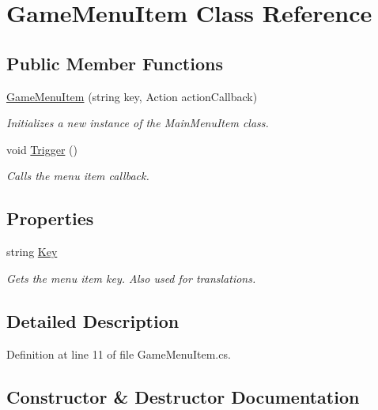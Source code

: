 \hypertarget{class_game_menu_item}{}\section{Game\+Menu\+Item Class Reference}
\label{class_game_menu_item}
\subsection*{Public Member Functions}
\begin{DoxyCompactItemize}
\item 
\hyperlink{class_game_menu_item_a2d561ad6974852ba1b08f2cab26d659f}{Game\+Menu\+Item} (string key, Action action\+Callback)
\begin{DoxyCompactList}\small\item\em Initializes a new instance of the Main\+Menu\+Item class. \end{DoxyCompactList}\item 
void \hyperlink{class_game_menu_item_af2fb348206b6f5c25687879a4f5194de}{Trigger} ()
\begin{DoxyCompactList}\small\item\em Calls the menu item callback. \end{DoxyCompactList}\end{DoxyCompactItemize}
\subsection*{Properties}
\begin{DoxyCompactItemize}
\item 
string \hyperlink{class_game_menu_item_a2a0b524f6aa138e136d7e11be2007f41}{Key}
\begin{DoxyCompactList}\small\item\em Gets the menu item key. Also used for translations. \end{DoxyCompactList}\end{DoxyCompactItemize}


\subsection{Detailed Description}


Definition at line 11 of file Game\+Menu\+Item.\+cs.



\subsection{Constructor \& Destructor Documentation}
\mbox{\label{class_game_menu_item_a2d561ad6974852ba1b08f2cab26d659f}} 
